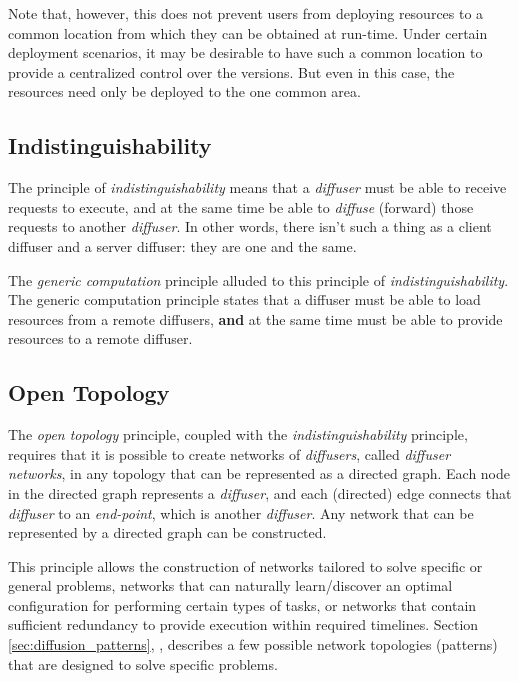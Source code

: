 \documentclass[11pt]{article}
\begin{document}
Note that, however, this does not prevent users from deploying resources to a common location from which they can be obtained at run-time. Under certain deployment scenarios, it may be desirable to have such a common location to provide a centralized control over the versions. But even in this case, the resources need only be deployed to the one common area.

\subsection{Indistinguishability\label{sec:indistinguishability}}
The principle of \emph{indistinguishability} means that a \emph{diffuser} must be able to receive requests to execute, and at the same time be able to \emph{diffuse} (forward) those requests to another \emph{diffuser}. In other words, there isn't such a thing as a client diffuser and a server diffuser: they are one and the same.

The \emph{generic computation} principle alluded to this principle of \emph{indistinguishability}. The generic computation principle states that a diffuser must be able to load resources from a remote diffusers, \textbf{and} at the same time must be able to provide resources to a remote diffuser.

\subsection{Open Topology\label{sec:open_topoloogy}}
The \emph{open topology} principle, coupled with the \emph{indistinguishability} principle, requires that it is possible to create networks of \emph{diffusers}, called \emph{diffuser networks}, in any topology that can be represented as a directed graph. Each node in the directed graph represents a \emph{diffuser}, and each (directed) edge connects that \emph{diffuser} to an \emph{end-point}, which is another \emph{diffuser}. Any network that can be represented by a directed graph can be constructed. 

This principle allows the construction of networks tailored to solve specific or general problems, networks that can naturally learn/discover an optimal configuration for performing certain types of tasks, or networks that contain sufficient redundancy to provide execution within required timelines. Section \ref{sec:diffusion_patterns}, \emph{}, describes a few possible network topologies (patterns) that are designed to solve specific problems.
\end{document}

